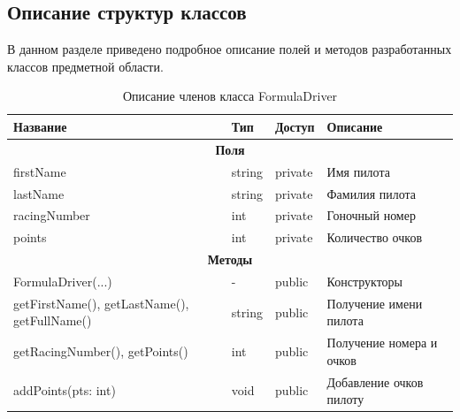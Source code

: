 \subsection*{Описание структур классов}

В данном разделе приведено подробное описание полей и методов разработанных классов предметной области.

\begin{table}[htbp]
\centering
\caption{Описание членов класса FormulaDriver}
\begin{tabular}{|p{5.5cm}|p{3cm}|p{2cm}|p{5cm}|}
\hline
\textbf{Название} & \textbf{Тип} & \textbf{Доступ} & \textbf{Описание} \\ \hline
\multicolumn{4}{|c|}{\textbf{Поля}} \\ \hline
firstName & string & private & Имя пилота \\ \hline
lastName & string & private & Фамилия пилота \\ \hline
racingNumber & int & private & Гоночный номер \\ \hline
points & int & private & Количество очков \\ \hline
\multicolumn{4}{|c|}{\textbf{Методы}} \\ \hline
FormulaDriver(...) & - & public & Конструкторы \\ \hline
getFirstName(), getLastName(), getFullName() & string & public & Получение имени пилота \\ \hline
getRacingNumber(), getPoints() & int & public & Получение номера и очков \\ \hline
addPoints(pts: int) & void & public & Добавление очков пилоту \\ \hline
\end{tabular}
\end{table}

